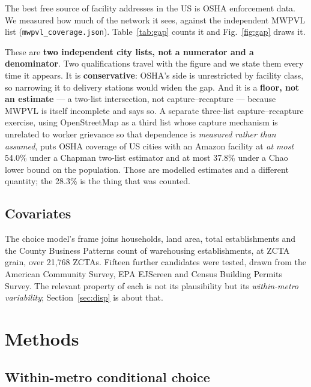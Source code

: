 \documentclass[conference]{IEEEtran}
\begin{document}
The best free source of facility addresses in the US is OSHA enforcement data.
We measured how much of the network it sees, against the independent MWPVL
list (\texttt{mwpvl\_coverage.json}). Table~\ref{tab:gap} counts it and
Fig.~\ref{fig:gap} draws it.

These are \textbf{two independent city lists, not a numerator and a
denominator}. Two qualifications travel with the figure and we state them
every time it appears. It is \textbf{conservative}: OSHA's side is
unrestricted by facility class, so narrowing it to delivery stations would
widen the gap. And it is a \textbf{floor, not an estimate} --- a two-list
intersection, not capture--recapture --- because MWPVL is itself incomplete
and says so. A separate three-list capture--recapture exercise, using
OpenStreetMap as a third list whose capture mechanism is unrelated to worker
grievance so that dependence is \emph{measured rather than assumed}, puts OSHA
coverage of US cities with an Amazon facility at \emph{at most} 54.0\% under a
Chapman two-list estimator and at most 37.8\% under a Chao lower bound on the
population. Those are modelled estimates and a different quantity; the 28.3\%
is the thing that was counted.

\subsection{Covariates}

The choice model's frame joins households, land area, total establishments and
the County Business Patterns count of warehousing establishments, at ZCTA
grain, over 21{,}768 ZCTAs. Fifteen further candidates were tested, drawn from
the American Community Survey, EPA EJScreen and Census Building Permits
Survey. The relevant property of each is not its plausibility but its
\emph{within-metro variability}; Section~\ref{sec:disp} is about that.

\section{Methods}

\subsection{Within-metro conditional choice}
\end{document}
